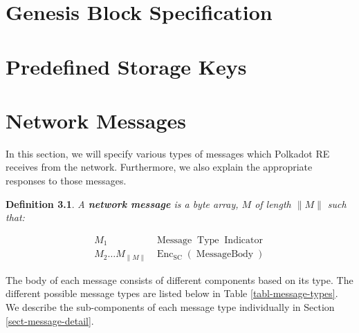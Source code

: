 \documentclass{book}
\newcommand{\tmop}[1]{\ensuremath{\operatorname{#1}}}
\newcommand{\tmstrong}[1]{\textbf{#1}}
\newtheorem{definition}{Definition}
\newtheorem{definition}{Definition}
\begin{document}
\chapter{Genesis Block Specification}\label{sect-genisis-block}

\chapter{Predefined Storage Keys}\label{sect-predef-storage-keys}

\chapter{Network Messages}\label{sect-network-messages}

In this section, we will specify various types of messages which Polkadot RE
receives from the network. Furthermore, we also explain the appropriate
responses to those messages.

\begin{definition}
  A {\tmstrong{network message}} is a byte array, {\tmstrong{$M$}} of length
  $\| M \|$ such that:
  
  
  \[ \begin{array}{cc}
       M_1 & \tmop{Message} \tmop{Type} \tmop{Indicator}\\
       M_2 \ldots M_{\| M \|} & \tmop{Enc}_{\tmop{SC}} (\tmop{MessageBody})
     \end{array} \]
  
\end{definition}

The body of each message consists of different components based on its type.
The different possible message types are listed below in Table
\ref{tabl-message-types}. We describe the sub-components of each message type
individually in Section \ref{sect-message-detail}.
\end{document}
